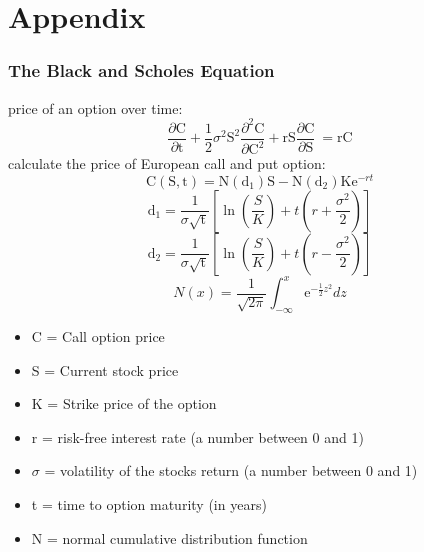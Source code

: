\documentclass[aspectratio=169]{beamer}
\begin{document}
\section{Appendix}
\begin{frame}
\frametitle{The Black and Scholes Equation}
%
\begin{minipage}{0.6\textwidth}
\begin{small}
%
price of an option over time:
\begin{equation}
	\frac{\partial \mathrm C}{ \partial \mathrm t } + \frac{1}{2}\sigma^{2} \mathrm S^{2} \frac{\partial^{2} \mathrm C}{\partial \mathrm C^2}
	+ \mathrm r \mathrm S \frac{\partial \mathrm C}{\partial \mathrm S}\ =
	\mathrm r \mathrm C 
	\label{eq:1}
\end{equation}
%
calculate the price of European call and put option: 
\begin{equation}
	\mathrm C(\mathrm S,\mathrm t)= \mathrm N(\mathrm d_1)\mathrm S - \mathrm N(\mathrm d_2) \mathrm K \mathrm e^{-rt}
	\label{eq:2}
\end{equation}
\vspace{-3pt}
%
\begin{equation}
	\mathrm d_1= \frac{1}{\sigma \sqrt{\mathrm t}} \left[\ln{\left(\frac{S}{K}\right)} + t\left(r + \frac{\sigma^2}{2} \right) \right]
\end{equation}
\vspace{-3pt}
%
\begin{equation}
	\mathrm d_2= \frac{1}{\sigma \sqrt{\mathrm t}} \left[\ln{\left(\frac{S}{K}\right)} + t\left(r - \frac{\sigma^2}{2} \right) \right]
\end{equation}
\vspace{-3pt}
%
\begin{equation}
	N(x)=\frac{1}{\sqrt{2\pi}} \int_{-\infty}^{x} \mathrm e^{-\frac{1}{2}z^2} dz
	\label{eq:5}
\end{equation}
\end{small}
\end{minipage}
%
\begin{minipage}{0.35\textwidth}
\begin{footnotesize}
\begin{itemize}
	\item[] C = Call option price 
	\item[] S = Current stock price
	\item[] K = Strike price of the option
	\item[] r = risk-free interest rate (a number between 0 and 1)
	\item[] $\sigma$ = volatility of the stocks return (a number between 0 and 1)
	\item[] t = time to option maturity (in years)
	\item[] N = normal cumulative distribution function
\end{itemize}
\end{footnotesize}
\end{minipage}
%
\end{frame}
\end{document}
